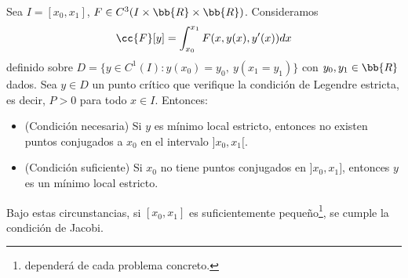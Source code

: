\begin{teo}
    Sea $I=[x_0,x_1]$, $F\in C^3(I \times \bb{R} \times \bb{R})$. Consideramos 
    \begin{gather*}
        \cc{F}[y] = \int_{x_0}^{x_1} F(x,y(x),y'(x))dx
    \end{gather*}
    definido sobre $D = \{y\in C^1(I) : y(x_0)=y_0,\ y(x_1=y_1)\}$ con $y_0, y_1\in \bb{R}$ dados. Sea $y\in D$ un punto crítico que verifique la condición de Legendre estricta, es decir, $P>0$ para todo $x\in I$. Entonces:
    \begin{itemize}
        \item (Condición necesaria) Si $y$ es mínimo local estricto, entonces no existen puntos conjugados a $x_0$ en el intervalo $]x_0, x_1[$.
        \item (Condición suficiente) Si $x_0$ no tiene puntos conjugados en $]x_0,x_1]$, entonces $y$ es un mínimo local estricto.
    \end{itemize}
\end{teo}

\begin{coro}
    Bajo estas circunstancias, si $[x_0,x_1]$ es suficientemente pequeño\footnote{dependerá de cada problema concreto.}, se cumple la condición de Jacobi.
\end{coro}

